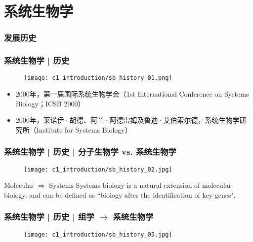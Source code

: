 \section{系统生物学}
\subsubsection{发展历史}
\begin{frame}
  \frametitle{系统生物学 | 历史}
  \begin{figure}
    \centering
    \texttt{[image: c1\_introduction/sb\_history\_01.png]}
  \end{figure}
  \vspace{-1em}
    \begin{itemize}
    \item 2000年，第一届国际系统生物学会（1st International Conference on Systems Biology；ICSB 2000）
    \item 2000年，莱诺伊·胡德、阿兰·阿德雷姆及鲁迪·艾伯索尔德，系统生物学研究所（Institute for Systems Biology）
  \end{itemize}
\end{frame}

\begin{frame}
  \frametitle{系统生物学 | 历史 | 分子生物学 vs. 系统生物学}
  \begin{figure}
    \centering
    \texttt{[image: c1\_introduction/sb\_history\_02.jpg]}
  \end{figure}
  \vspace{-0.8em}
    \begin{block}{Molecular $\Rightarrow$ Systems}
  Systems biology is a natural extension of molecular biology, and can be defined as ``biology after the identification of key genes".
  \end{block}
\end{frame}

\begin{frame}
  \frametitle{系统生物学 | 历史 | 组学 $\rightarrow$ 系统生物学}
  \begin{figure}
    \centering
    \texttt{[image: c1\_introduction/sb\_history\_05.jpg]}
  \end{figure}
\end{frame}

